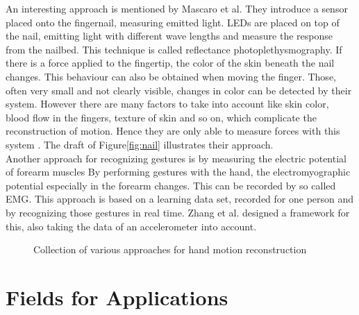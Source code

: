 An interesting approach is mentioned by Mascaro et al. They introduce a sensor placed onto the fingernail, measuring emitted light. LEDs are placed on top of the nail, emitting light with different wave lengths and measure the response from the nailbed. This technique is called reflectance photoplethysmography. If there is a force applied to the fingertip, the color of the skin beneath the nail changes. This behaviour can also be obtained when moving the finger. Those, often very small and not clearly visible, changes in color can be detected by their system. However there are many factors to take into account like skin color, blood flow in the fingers, texture of skin and so on, which complicate the reconstruction of motion. Hence they are only able to measure forces with this system \cite{mascaro2001photoplethysmograph}. The draft of Figure\ref{fig:nail} illustrates their approach.\\
Another approach for recognizing gestures is by measuring the electric potential of forearm muscles \cite{kim2008emg} By performing gestures with the hand, the electromyographic potential especially in the forearm changes. This can be recorded by so called \ac{EMG}. This approach is based on a learning data set, recorded for one person and by recognizing those gestures in real time. Zhang et al. \cite{zhang2011framework} designed a framework for this, also taking the data of an accelerometer into account.

\begin{figure}[h]
	\hfill
	\hfill
	\hfill
	
	\caption{Collection of various approaches for hand motion reconstruction}
	\label{fig:examplesOther}
\end{figure}

\FloatBarrier


\section{Fields for Applications} \label{sec:applications}

